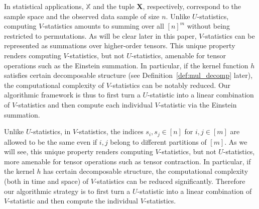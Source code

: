 \documentclass[sn-mathphys, natbib=false]{sn-jnl}
\theoremstyle{plain}
\theoremstyle{definition}
\newtheorem{remark}{Remark}
\newcommand{\sper}{\sigma}
\newcommand{\ustat}{\mathbb{U}}
\newcommand{\vstat}{\mathbb{V}}
\newcommand{\ustatp}[2]{\ustat(#1,#2)}
\newcommand{\vstatp}[2]{\vstat(#1,#2)}
\newcommand{\Lin}[1]{{\color{purple}{#1}}}
\def\bbX{\mathbb{X}}
\begin{document}
\begin{bibunit}[agsm]
In statistical applications, $\bbX$ and the tuple $\bm{X}$, respectively, correspond to the sample space and the observed data sample of size $n$. Unlike $U$-statistics, computing $V$-statistics amounts to summing over all $[n]^{m}$ without being restricted to permutations. As will be clear later in this paper, $V$-statistics can be represented as summations over higher-order tensors. This unique property renders computing $V$-statistics, but not $U$-statistics, amenable for tensor operations such as the Einstein summation. In particular, if the kernel function $h$ satisfies certain decomposable structure (see Definition~\ref{def:mul_decomp} later), the computational complexity of $V$-statistics can be notably reduced.
Our algorithmic framework is thus to first turn a $U$-statistic into a linear combination of $V$-statistics and then compute each individual $V$-statistic via the Einstein summation.

\iffalse
Unlike $U$-statistics, in $V$-statistics, the indices $s_{i}, s_{j} \in [n]$ for $i, j \in [m]$ are allowed to be the same even if $i, j$ belong to different partitions of $[m]$. As we will see, this unique property renders computing $V$-statistics, but not $U$-statistics, more amenable for tensor operations such as tensor contraction. In particular, if the kernel $h$ has certain decomposable structure, the computational complexity (both in time and space) of $V$-statistics can be reduced significantly. Therefore our algorithmic strategy is to first turn a $U$-statistic into a linear combination of $V$-statistic and then compute the individual $V$-statistics.


\end{bibunit}
\end{document}
